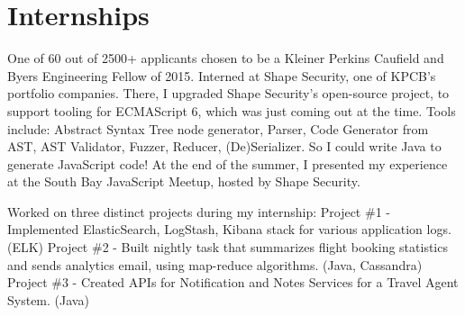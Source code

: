 \documentclass[letterpaper]{deedy-resume-openfont} %
\begin{document}

\newpage %

\begin{minipage}[t]{0.29\textwidth} %

\section{}

\end{minipage} %
\hfill
\begin{minipage}[t]{0.7\textwidth} %


\section{Internships}


One of 60 out of 2500+ applicants chosen to be a Kleiner Perkins Caufield and Byers Engineering Fellow of 2015. Interned at Shape Security, one of KPCB's portfolio companies. There, I upgraded Shape Security's open-source project, to support tooling for ECMAScript 6, which was just coming out at the time. Tools include: Abstract Syntax Tree node generator, Parser, Code Generator from AST, AST Validator, Fuzzer, Reducer, (De)Serializer. So I could write Java to generate JavaScript code! At the end of the summer, I presented my experience at the South Bay JavaScript Meetup, hosted by Shape Security. 

\sectionsep %



Worked on three distinct projects during my internship:
Project \#1 - Implemented ElasticSearch, LogStash, Kibana stack for various application logs. (ELK)
Project \#2 - Built nightly task that summarizes flight booking statistics and sends analytics email, using map-reduce algorithms. (Java, Cassandra)
Project \#3 - Created APIs for Notification and Notes Services for a Travel Agent System. (Java)


\end{minipage}
\end{document}
